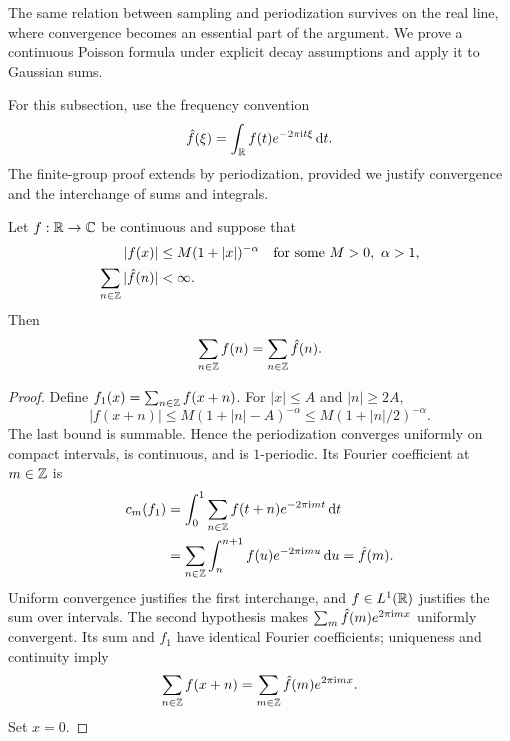 The same relation between sampling and periodization survives on the real
line, where convergence becomes an essential part of the argument. We prove
a continuous Poisson formula under explicit decay assumptions and apply it
to Gaussian sums.

For this subsection, use the frequency convention
\begin{equation}
\label{eq-defn-trans-fourier-special-fish}
 \hat{f}(\xi)=\int_{\mathbb{R}}f(t)e^{-2\pi\mathrm{i} t\xi}\,\mathrm{d} t.
\end{equation}
The finite-group proof extends by periodization, provided we justify
convergence and the interchange of sums and integrals.

\begin{thm}
\label{thm-formula-fish-continue}
Let $f:\mathbb{R}\to\mathbb{C}$ be continuous and suppose that
\begin{align}
\label{eq-formula-fish-hyp1}
 |f(x)|&\leq M(1+|x|)^{-\alpha}
          \quad\text{for some }M>0,\ \alpha>1,\\
\label{eq-formula-fish-hyp2}
 \sum_{n\in\mathbb{Z}}|\hat{f}(n)|&<\infty.
\end{align}
Then
\begin{equation}
\label{eq-formula-fish-continue}
 \sum_{n\in\mathbb{Z}}f(n)=\sum_{n\in\mathbb{Z}}\hat{f}(n).
\end{equation}
\end{thm}
\begin{proof}
Define $f_1(x)=\sum_{n\in\mathbb{Z}}f(x+n)$.
For $|x|\leq A$ and $|n|\geq2A$,
\[
 |f(x+n)|\leq M(1+|n|-A)^{-\alpha}
             \leq M(1+|n|/2)^{-\alpha}.
\]
The last bound is summable. Hence the periodization converges uniformly on
compact intervals, is continuous, and is $1$-periodic.
Its Fourier coefficient at $m\in\mathbb{Z}$ is
\begin{align*}
 c_m(f_1)
 &=\int_0^1\sum_{n\in\mathbb{Z}}f(t+n)e^{-2\pi\mathrm{i} mt}\,\mathrm{d} t\\
 &=\sum_{n\in\mathbb{Z}}\int_n^{n+1}f(u)e^{-2\pi\mathrm{i} mu}\,\mathrm{d} u
 =\hat{f}(m).
\end{align*}
Uniform convergence justifies the first interchange, and $f\in L^1(\mathbb{R})$
justifies the sum over intervals. The second hypothesis makes
$\sum_m\hat{f}(m)e^{2\pi\mathrm{i} mx}$ uniformly convergent. Its sum and $f_1$
have identical Fourier coefficients; uniqueness and continuity imply
\[
 \sum_{n\in\mathbb{Z}}f(x+n)=\sum_{m\in\mathbb{Z}}\hat{f}(m)e^{2\pi\mathrm{i} mx}.
\]
Set $x=0$.
\end{proof}


